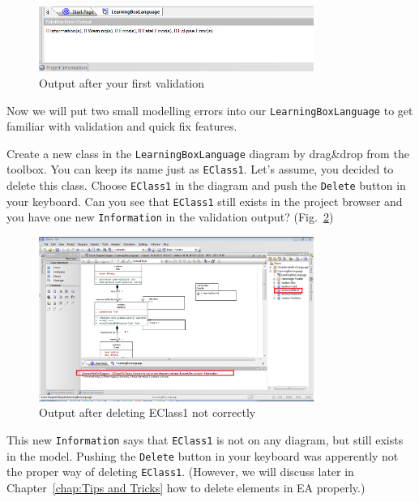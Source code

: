 \begin{figure}[htbp]
	\centering 
  \includegraphics[width=0.8\textwidth]{pics/memBoxBilder/memBox42} 
	\caption{Output after your first validation}
	\label{fig:first_validation}
\end{figure}

Now we will put two small modelling errors into our \texttt{LearningBoxLanguage}
to get familiar with validation and quick fix features.

Create a new class in the \texttt{Learning\-Box\-Language} diagram by drag\&drop from the
toolbox. You can keep its name just as \texttt{EClass1}. Let's assume, you
decided to delete this class. Choose \texttt{EClass1} in the diagram and push the
\texttt{Delete} button in your keyboard. Can you see that \texttt{EClass1} still
exists in the project browser and you have one new \texttt{Information} in the
validation output? (Fig.~\ref{fig:validation_information})

\begin{figure}[htbp]
	\centering 
  \includegraphics[width=0.8\textwidth]{pics/memBoxBilder/memBox43} 
	\caption{Output after deleting EClass1 not correctly}
	\label{fig:validation_information}
\end{figure}

This new \texttt{Information} says that \texttt{EClass1} is not on any diagram, but still
exists in the model. Pushing the \texttt{Delete} button in your keyboard was
apperently not the proper way of deleting \texttt{EClass1}. (However, we will
discuss later in Chapter~\ref{chap:Tips and Tricks} how to delete elements in EA properly.)

